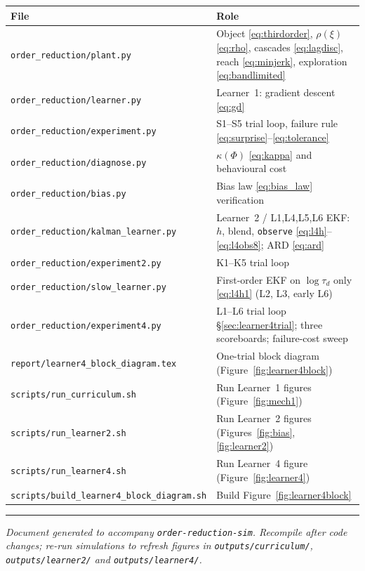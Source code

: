 \documentclass[11pt,a4paper]{article}
\begin{document}
\begin{center}
\small
\begin{tabular}{@{}ll@{}}
\toprule
\textbf{File} & \textbf{Role} \\
\midrule
\texttt{order\_reduction/plant.py} & Object \eqref{eq:thirdorder}, $\rho(\xi)$ \eqref{eq:rho}, cascades \eqref{eq:lagdisc}, reach \eqref{eq:minjerk}, exploration \eqref{eq:bandlimited} \\
\texttt{order\_reduction/learner.py} & Learner~1: gradient descent \eqref{eq:gd} \\
\texttt{order\_reduction/experiment.py} & S1--S5 trial loop, failure rule \eqref{eq:surprise}--\eqref{eq:tolerance} \\
\texttt{order\_reduction/diagnose.py} & $\kappa(\Phi)$ \eqref{eq:kappa} and behavioural cost \\
\texttt{order\_reduction/bias.py} & Bias law \eqref{eq:bias_law} verification \\
\texttt{order\_reduction/kalman\_learner.py} & Learner~2 / L1,L4,L5,L6 EKF: $h$, blend, \texttt{observe} \eqref{eq:l4h}--\eqref{eq:l4obs8}; ARD \eqref{eq:ard} \\
\texttt{order\_reduction/experiment2.py} & K1--K5 trial loop \\
\texttt{order\_reduction/slow\_learner.py} & First-order EKF on $\log\tau_d$ only \eqref{eq:l4h1} (L2, L3, early L6) \\
\texttt{order\_reduction/experiment4.py} & L1--L6 trial loop \S\ref{sec:learner4trial}; three scoreboards; failure-cost sweep \\
\texttt{report/learner4\_block\_diagram.tex} & One-trial block diagram (Figure~\ref{fig:learner4block}) \\
\texttt{scripts/run\_curriculum.sh} & Run Learner~1 figures (Figure~\ref{fig:mech1}) \\
\texttt{scripts/run\_learner2.sh} & Run Learner~2 figures (Figures~\ref{fig:bias}, \ref{fig:learner2}) \\
\texttt{scripts/run\_learner4.sh} & Run Learner~4 figure (Figure~\ref{fig:learner4}) \\
\texttt{scripts/build\_learner4\_block\_diagram.sh} & Build Figure~\ref{fig:learner4block} \\
\bottomrule
\end{tabular}
\end{center}

\vfill
\hrule
\small
\textit{Document generated to accompany \texttt{order-reduction-sim}. Recompile
after code changes; re-run simulations to refresh figures in
\texttt{outputs/curriculum/}, \texttt{outputs/learner2/} and
\texttt{outputs/learner4/}.}
\end{document}
